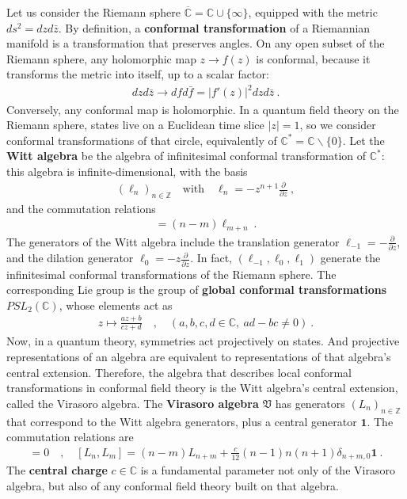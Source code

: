 \documentclass[12pt, a4paper]{article}
\theoremstyle{break}
\begin{document}
Let us consider the Riemann sphere $\overline{\mathbb{C}}=\mathbb{C}\cup \{\infty\}$, equipped with the metric $ds^2 = dzd\bar z$. By definition, a \textbf{conformal transformation} of a Riemannian manifold is a transformation that preserves angles. On any open subset of the Riemann sphere, any holomorphic map $z\to f(z)$ is conformal, because it transforms the metric into itself, up to a scalar factor: 
\begin{align}
 dzd\bar z\to dfd\bar f = |f'(z)|^2 dzd\bar z\ .
\end{align}
Conversely, any conformal map is holomorphic. 
In a quantum field theory on the Riemann sphere, states live on a Euclidean time slice $|z|=1$, so we consider conformal transformations of that circle, equivalently of $\mathbb{C}^*= \mathbb{C}\backslash \{0\}$.
Let the \textbf{Witt algebra} be the algebra of infinitesimal conformal transformation of $\mathbb{C}^*$: this algebra is infinite-dimensional, with the basis 
\begin{align}
 \left(\ell_n\right)_{n\in\mathbb{Z}}  \quad \text{with} \quad \ell_n = -z^{n+1}\frac{\partial}{\partial z}\ ,
 \label{lpz}
\end{align}
and the commutation relations 
\begin{align}
 [\ell_n,\ell_m] = (n-m)\ell_{m+n}\ .
\end{align}
The generators of the Witt algebra include the translation generator $\ell_{-1} = -\frac{\partial}{\partial z}$, and the dilation generator $\ell_0 = -z\frac{\partial}{\partial z}$. In fact, $(\ell_{-1},\ell_0,\ell_1)$ generate the infinitesimal conformal transformations of the Riemann sphere.
The corresponding Lie group is the group of \textbf{global conformal transformations} $PSL_2(\mathbb{C})$, whose elements act as 
\begin{align}
 z \mapsto \frac{az+b}{cz+d}\quad , \quad (a,b,c,d\in \mathbb{C},\ ad-bc\neq 0)\ .
 \label{abcd}
\end{align}
Now, in a quantum theory, symmetries act projectively on states. And projective representations of an algebra are equivalent to representations of that algebra's central extension. Therefore, the algebra that describes local conformal transformations in conformal field theory is the Witt algebra's central extension, called the Virasoro algebra. The \textbf{Virasoro algebra} $\mathfrak{V}$ has generators $(L_n)_{n\in\mathbb{Z}}$ that correspond to the Witt algebra generators, plus a central generator $\mathbf 1$. The commutation relations are 
 \begin{align}
  [\mathbf 1, L_n] = 0 \quad , \quad \boxed{[L_n,L_m] = (n-m)L_{n+m} +\frac{c}{12}(n-1)n(n+1)\delta_{n+m,0}\mathbf 1} \ .
  \label{vir}
 \end{align}
 The \textbf{central charge} $c\in\mathbb{C}$ is a fundamental parameter not only of the Virasoro algebra, but also of any conformal field theory built on that algebra. 
\end{document}
